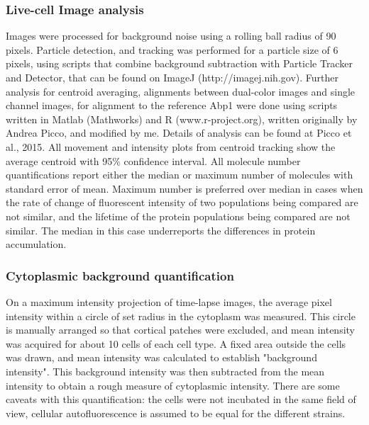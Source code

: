 \subsubsection{Live-cell Image analysis}
Images were processed for background noise using a rolling ball radius of 90 pixels. Particle detection, and tracking was performed for a particle size of 6 pixels, using scripts that combine background subtraction with Particle Tracker and Detector, that can be found on ImageJ (http://imagej.nih.gov). Further analysis for centroid averaging, alignments between dual-color images and single channel images, for alignment to the reference Abp1 were done using scripts written in Matlab (Mathworks) and R (www.r-project.org), written originally by Andrea Picco, and modified by me. Details of analysis can be found at Picco et al., 2015. All movement and intensity plots from centroid tracking show the average centroid with 95\% confidence interval. All molecule number quantifications report either the median or maximum number of molecules with standard error of mean. Maximum number is preferred over median in cases when the rate of change of fluorescent intensity of two populations being compared are not similar, and the lifetime of the protein populations being compared are not similar. The median in this case underreports the differences in protein accumulation. 

\subsubsection{Cytoplasmic background quantification}
On a maximum intensity projection of time-lapse images, the average pixel intensity within a circle of set radius in the cytoplasm was measured. This circle is manually arranged so that cortical patches were excluded, and mean intensity was acquired for about 10 cells of each cell type. A fixed area outside the cells was drawn, and mean intensity was calculated to establish "background intensity". This background intensity was then subtracted from the mean intensity to obtain a rough measure of cytoplasmic intensity.
There are some caveats with this quantification: the cells were not incubated in the same field of view, cellular autofluorescence is assumed to be equal for the different strains. 
